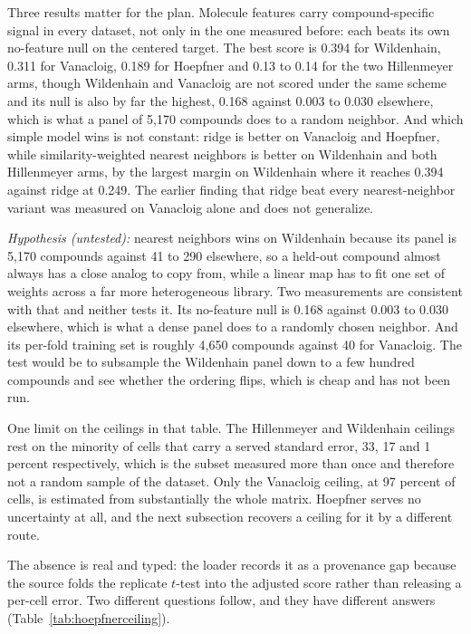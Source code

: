 Three results matter for the plan. Molecule features carry compound-specific signal in every
dataset, not only in the one measured before: each beats its own no-feature null on the
centered target. The best score is 0.394 for Wildenhain, 0.311 for Vanacloig, 0.189 for
Hoepfner and 0.13 to 0.14 for the two Hillenmeyer arms, though Wildenhain and Vanacloig are
not scored under the same scheme and its null is also by far the highest, 0.168 against 0.003
to 0.030 elsewhere, which is what a panel of 5{,}170 compounds does to a random neighbor. And
which simple model wins is not constant:
ridge is better on Vanacloig and Hoepfner, while similarity-weighted nearest neighbors is
better on Wildenhain and both Hillenmeyer arms, by the largest margin on Wildenhain where it
reaches 0.394 against ridge at 0.249. The earlier finding that ridge beat every
nearest-neighbor variant was measured on Vanacloig alone and does not generalize.

\textit{Hypothesis (untested):} nearest neighbors wins on Wildenhain because its panel is
5{,}170 compounds against 41 to 290 elsewhere, so a held-out compound almost always has a
close analog to copy from, while a linear map has to fit one set of weights across a far more
heterogeneous library. Two measurements are consistent with that and neither tests it. Its
no-feature null is 0.168 against 0.003 to 0.030 elsewhere, which is what a dense panel does to
a randomly chosen neighbor. And its per-fold training set is roughly 4{,}650 compounds against
40 for Vanacloig. The test would be to subsample the Wildenhain panel down to a few hundred
compounds and see whether the ordering flips, which is cheap and has not been run.

One limit on the ceilings in that table. The Hillenmeyer and Wildenhain ceilings rest on the
minority of cells that carry a served standard error, 33, 17 and 1 percent respectively, which
is the subset measured more than once and therefore not a random sample of the dataset. Only
the Vanacloig ceiling, at 97 percent of cells, is estimated from substantially the whole
matrix. Hoepfner serves no uncertainty at all, and the next subsection recovers a ceiling for
it by a different route.

The absence is real and typed: the loader records it as a provenance gap because the source
folds the replicate $t$-test into the adjusted score rather than releasing a per-cell error.
Two different questions follow, and they have different answers
(Table~\ref{tab:hoepfnerceiling}).

